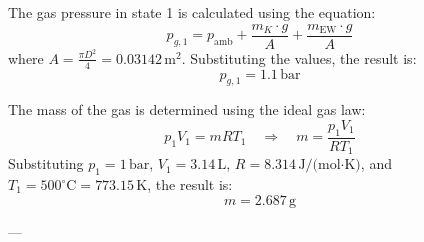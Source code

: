 The gas pressure in state 1 is calculated using the equation:  
\[
p_{g,1} = p_{\text{amb}} + \frac{m_K \cdot g}{A} + \frac{m_{\text{EW}} \cdot g}{A}
\]  
where \( A = \frac{\pi D^2}{4} = 0.03142 \, \text{m}^2 \).  
Substituting the values, the result is:  
\[
p_{g,1} = 1.1 \, \text{bar}
\]  

The mass of the gas is determined using the ideal gas law:  
\[
p_1 V_1 = m R T_1 \quad \Rightarrow \quad m = \frac{p_1 V_1}{R T_1}
\]  
Substituting \( p_1 = 1 \, \text{bar} \), \( V_1 = 3.14 \, \text{L} \), \( R = 8.314 \, \text{J/(mol·K)} \), and \( T_1 = 500^\circ\text{C} = 773.15 \, \text{K} \), the result is:  
\[
m = 2.687 \, \text{g}
\]  

---